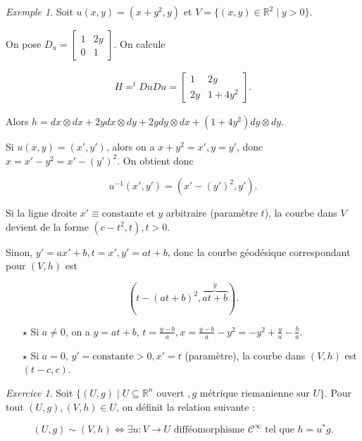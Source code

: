\documentclass[french]{article}
\theoremstyle{definition}
\theoremstyle{remark}
\newtheorem{exo}{Exercice}
\newtheorem*{protoexemple}{Exemple}
\newenvironment{exemple}
    {\colorlet{shadecolor}{gray!10}\begin{shaded}\begin{protoexemple}}
    {\end{protoexemple}\end{shaded}}
\newcommand{\biggg}{>}
\newcommand{\bg}{\biggg}
\begin{document}
\begin{exemple}
  Soit \(u(x,y) = (x + y ^2, y)\) et \(V = \{ (x,y) \in \mathbb{R}^2 \mid y \bg 0 \}\).

  On pose \(D_u = \begin{bmatrix}
    1 & 2 y \\
    0 & 1
  \end{bmatrix}\). On calcule

  \begin{gather*}
    H = ^{t} Du Du = \begin{bmatrix}
      1 & 2y \\
      2 y & 1 + 4y ^2
  \end{bmatrix}.
\end{gather*}

  Alors \(h = dx \otimes dx + 2 y dx \otimes dy + 2 y dy \otimes dx + (1+ 4y ^2)dy \otimes dy\).


  Si \(u(x,y) = (x', y')\), alors on a \(x+ y ^2 = x', y=y'\), donc \(x = x' - y ^2 = x' - (y')^2\). On obtient donc

  \[u ^{-1}(x',y') = (x' - (y')^2,y').\]

  Si la ligne droite \(x' \equiv \text{constante}\) et \(y\) arbitraire (paramètre \(t\)), la courbe dans \(V\) devient de la forme \((c -t ^2, t), t \bg 0\).


  Sinon, \(y' = ax'+b, t=x', y'=at+b\), donc la courbe géodésique correspondant pour \((V,h)\) est

  \[(t -(at+b)^2, \overbrace{at+b}^{y} ).\]

  \begin{itemize}
    \item [$\star$] Si \(a \neq 0\), on  a \(y = at+b\), \(t = \displaystyle\frac{y-b}{a}, x = \displaystyle\frac{y-b}{a} - y ^2 = -y ^2+ \displaystyle\frac{y}{a} - \displaystyle\frac{b}{a}\).
    \item [$\star$] Si \(a= 0\), \(y'= \text{constante} \bg 0, x' = t\) (paramètre), la courbe dans \((V,h)\) est \((t-c,c)\).
  \end{itemize}
\end{exemple}

\begin{exo}
  Soit \(\{ (U,g) \mid U \subseteq \mathbb{R}^n \text{ ouvert }, g \text{ métrique riemanienne sur } U\}\). Pour tout \((U,g), (V,h) \in U\), on définit la relation suivante :

  \[(U,g) \sim (V,h) \iff \exists u : V \longrightarrow U \text{ difféomorphisme } \mathcal{C}^{\infty} \text{ tel que } h = u ^{*}g.\]
\end{exo}
\end{document}
